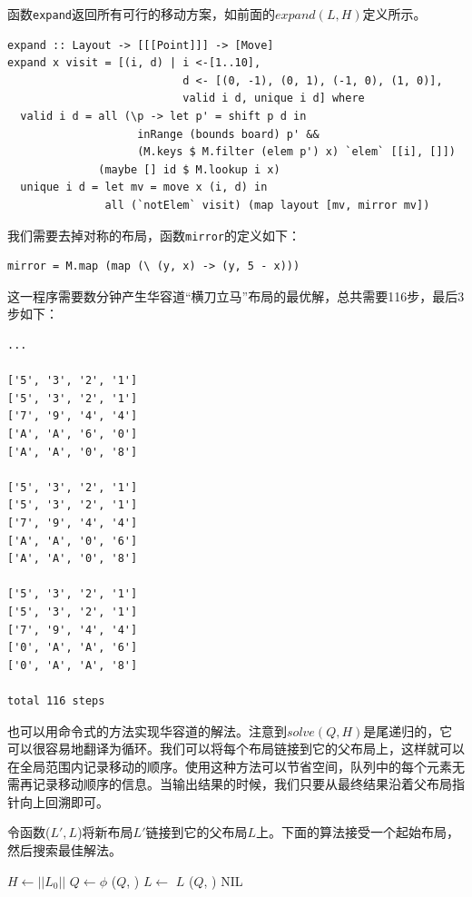 \documentclass[b5paper]{ctexart}
\begin{document}
函数\texttt{expand}返回所有可行的移动方案，如前面的$expand(L, H)$定义所示。

\lstset{language=Haskell}
\begin{lstlisting}[style=Haskell]
expand :: Layout -> [[[Point]]] -> [Move]
expand x visit = [(i, d) | i <-[1..10],
                           d <- [(0, -1), (0, 1), (-1, 0), (1, 0)],
                           valid i d, unique i d] where
  valid i d = all (\p -> let p' = shift p d in
                    inRange (bounds board) p' &&
                    (M.keys $ M.filter (elem p') x) `elem` [[i], []])
              (maybe [] id $ M.lookup i x)
  unique i d = let mv = move x (i, d) in
               all (`notElem` visit) (map layout [mv, mirror mv])
\end{lstlisting}

我们需要去掉对称的布局，函数\texttt{mirror}的定义如下：

\lstset{language=Haskell}
\begin{lstlisting}[style=Haskell]
mirror = M.map (map (\ (y, x) -> (y, 5 - x)))
\end{lstlisting}

这一程序需要数分钟产生华容道“横刀立马”布局的最优解，总共需要116步，最后3步如下：

\begin{verbatim}
...

['5', '3', '2', '1']
['5', '3', '2', '1']
['7', '9', '4', '4']
['A', 'A', '6', '0']
['A', 'A', '0', '8']

['5', '3', '2', '1']
['5', '3', '2', '1']
['7', '9', '4', '4']
['A', 'A', '0', '6']
['A', 'A', '0', '8']

['5', '3', '2', '1']
['5', '3', '2', '1']
['7', '9', '4', '4']
['0', 'A', 'A', '6']
['0', 'A', 'A', '8']

total 116 steps
\end{verbatim}

也可以用命令式的方法实现华容道的解法。注意到$solve(Q, H)$是尾递归的，它可以很容易地翻译为循环。我们可以将每个布局链接到它的父布局上，这样就可以在全局范围内记录移动的顺序。使用这种方法可以节省空间，队列中的每个元素无需再记录移动顺序的信息。当输出结果的时候，我们只要从最终结果沿着父布局指针向上回溯即可。

令函数($L', L$)将新布局$L'$链接到它的父布局$L$上。下面的算法接受一个起始布局，然后搜索最佳解法。

\begin{algorithmic}[1]
  \State $H \gets ||L_0||$
  \State $Q \gets \phi$
  \State {}($Q$, )
    \State $L \gets $ 
      \State \Return $L$
    \Else
        \State {}($Q$, )
        \State {}
      \EndFor
    \EndIf
  \EndWhile
  \State \Return NIL 
\EndFunction
\end{algorithmic}
\end{document}
